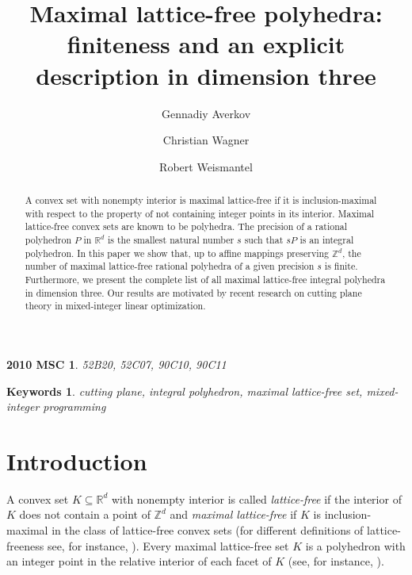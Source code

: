 \documentclass[a4paper]{article}
\title{Maximal lattice-free polyhedra: \\
  finiteness and an explicit description in dimension three}
\author{Gennadiy Averkov \and Christian Wagner \and Robert
  Weismantel}
\theoremstyle{plain}
\begin{document}
\maketitle

\begin{abstract}
A convex set with nonempty interior is maximal lattice-free
if it is inclusion-maximal with respect to the property of
not containing integer points in its interior.
Maximal lattice-free convex sets are known to be polyhedra.
The precision of a rational polyhedron $P$ in ${\mathbb{R}}^d$ is
the smallest natural number $s$ such that $sP$ is an
integral polyhedron.
In this paper we show that, up to affine mappings
preserving ${\mathbb{Z}}^d$, the number of maximal lattice-free
rational polyhedra of a given precision $s$ is finite.
Furthermore, we present the complete list of all maximal
lattice-free integral polyhedra in dimension three.
Our results are motivated by recent research on cutting
plane theory in mixed-integer linear optimization.
\end{abstract}

\theoremstyle{itdot}
\newtheorem*{msc*}{2010 MSC} 

\begin{msc*}
  52B20, 52C07, 90C10, 90C11
\end{msc*}

\newtheorem*{keywords*}{Keywords}

\begin{keywords*}
cutting plane, integral polyhedron, maximal lattice-free
set, mixed-integer programming 
\end{keywords*}

\section{Introduction}

A convex set $K \subseteq {\mathbb{R}}^d$ with nonempty interior is
called \emph{lattice-free} if the interior of $K$ does not
contain a point of ${\mathbb{Z}}^d$ and \emph{maximal lattice-free} if
$K$ is inclusion-maximal in the class of lattice-free convex
sets (for different definitions of lattice-freeness see, for
instance, \cite{Reznick86,Scarf85,Seboe99}).
Every maximal lattice-free set $K$ is a polyhedron with an
integer point in the relative interior of each facet of $K$
(see, for instance, \cite[Proposition~3.3]{Lovasz89}).
\end{document}
